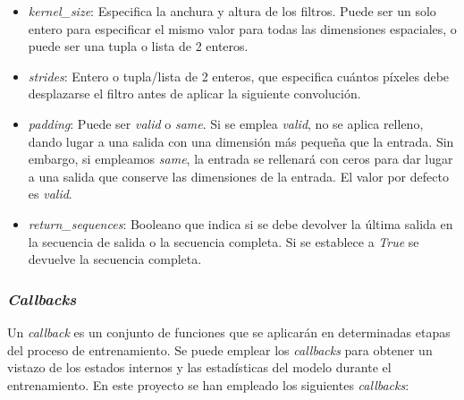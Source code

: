 \begin{itemize}
\begin{itemize}
            \item \textit{kernel\_size}: Especifica la anchura y altura de los filtros. Puede ser un solo entero para especificar el mismo valor para todas las dimensiones espaciales, o puede ser una tupla o lista de 2 enteros.
            
            \item \textit{strides}: Entero o tupla/lista de 2 enteros, que especifica cuántos píxeles debe desplazarse el filtro antes de aplicar la siguiente convolución.
            
            \item \textit{padding}: Puede ser \textit{valid} o \textit{same}. Si se emplea \textit{valid}, no se aplica relleno, dando lugar a una salida con una dimensión más pequeña que la entrada. Sin embargo, si empleamos \textit{same}, la entrada se rellenará con ceros para dar lugar a una salida que conserve las dimensiones de la entrada. El valor por defecto es \textit{valid}.
            
            \item \textit{return\_sequences}: Booleano que indica si se debe devolver la última salida en la secuencia de salida o la secuencia completa. Si se establece a \textit{True} se devuelve la secuencia completa.
        \end{itemize}
\end{itemize}


\subsubsection{\textit{Callbacks}} \label{callback}

Un \textit{callback} es un conjunto de funciones que se aplicarán en determinadas etapas del proceso de entrenamiento. Se puede emplear los \textit{callbacks} para obtener un vistazo de los estados internos y las estadísticas del modelo durante el entrenamiento. En este proyecto se han empleado los siguientes \textit{callbacks}:

